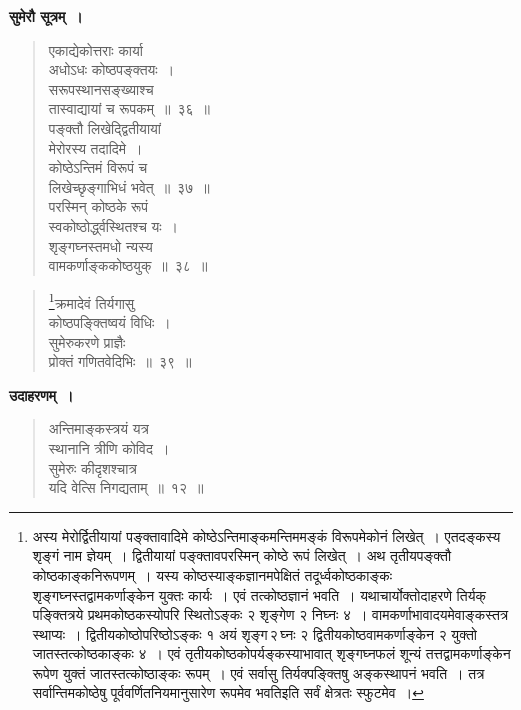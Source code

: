 \documentclass[11pt, openany]{book}
\begin{document}
\textbf{सुमेरौ सूत्रम्~।}

\begin{quote}
{\gk एकाद्येकोत्तराः कार्या\\
अधोऽधः कोष्ठपङ्क्तयः~।\\
सरूपस्थानसङ्ख्याश्च\\
तास्वाद्यायां च रूपकम्~॥~३६~॥\\
पङ्क्तौ लिखेद्द्वितीयायां\\
मेरोरस्य तदादिमे~।\\
कोष्ठेऽन्तिमं विरूपं च\\
लिखेच्छृङ्गाभिधं भवेत्~॥~३७~॥\\
परस्मिन् कोष्ठके रूपं\\
स्वकोष्ठोर्द्ध्वस्थितश्च यः~।\\
शृङ्गघ्नस्तमधो न्यस्य\\
वामकर्णाङ्ककोष्ठयुक्~॥~३८~॥	}
\end{quote}


\newpage

	



\begin{quote}
\renewcommand{\thefootnote}{१}\footnote{अस्य मेरोर्द्वितीयायां पङ्क्तावादिमे कोष्ठेऽन्तिमाङ्कमन्तिममङ्कं विरूपमेकोनं लिखेत्~। एतदङ्कस्य शृङ्गं नाम ज्ञेयम्~। द्वितीयायां पङ्क्तावपरस्मिन् कोष्ठे रूपं लिखेत्~। अथ तृतीयपङ्क्तौ कोष्ठकाङ्कनिरूपणम्~। यस्य कोष्ठस्याङ्कज्ञानमपेक्षितं तदूर्ध्वकोष्ठकाङ्कः शृङ्गघ्नस्तद्वामकर्णाङ्केन युक्तः कार्यः~। एवं तत्कोष्ठज्ञानं भवति~। यथाचार्योक्तोदाहरणे तिर्यक् पङ्क्तित्रये प्रथमकोष्ठकस्योपरि स्थितोऽङ्कः २ शृङ्गेण २ निघ्नः ४~। वामकर्णाभावादयमेवाङ्कस्तत्र स्थाप्यः~। द्वितीयकोष्ठोपरिष्ठोऽङ्कः १ अयं शृङ्ग\textendash \,२\textendash \,घ्नः २ द्वितीयकोष्ठवामकर्णाङ्केन २ युक्तो \;जातस्तत्कोष्ठकाङ्कः \;४~। \;एवं \;तृतीयकोष्ठकोपर्यङ्कस्याभावात् \;शृङ्गघ्नफलं \;शून्यं \;तत्तद्वामकर्णाङ्केन रूपेण युक्तं जातस्तत्कोष्ठाङ्कः रूपम्~। एवं सर्वासु तिर्यक्पङ्क्तिषु अङ्कस्थापनं भवति~। तत्र सर्वान्तिमकोष्ठेषु पूर्ववर्णितनियमानुसारेण रूपमेव भवति\textendash \;इति सर्वं क्षेत्रतः स्फुटमेव~।}{\gk क्रमादेवं तिर्यगासु\\
कोष्ठपङ्क्तिष्वयं विधिः~।\\
सुमेरुकरणे प्राज्ञैः\\
प्रोक्तं गणितवेदिभिः~॥~३९~॥	}
\end{quote}

\textbf{उदाहरणम्~।} 

\begin{quote}
{\ex अन्तिमाङ्कस्त्रयं यत्र\\
स्थानानि त्रीणि कोविद~।\\
सुमेरुः कीदृशश्चात्र\\
यदि वेत्सि निगद्यताम्~॥~१२~॥~}
\end{quote}
\end{document}
